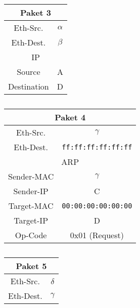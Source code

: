 \begin{table}[p]
    \centering
    \begin{tabular}{|c|c|}
        \hline
        \multicolumn{2}{|c|}{Paket 3} \\
        \hline
        Eth-Src.  & $\alpha$ \\
        \hline
        Eth-Dest. & $\beta$ \\
        \hline
        \multicolumn{2}{|c|}{IP} \\
        \hline
        Source & A \\
        \hline
        Destination & D \\
        \hline
    \end{tabular}
    \caption{}
    \label{tab:4.12.3}
\end{table}

\begin{table}[p]
    \begin{minipage}[t]{0.49\linewidth}
        \centering
        \begin{tabular}{|c|c|}
            \hline
            \multicolumn{2}{|c|}{Paket 4} \\
            \hline
            Eth-Src.  & $\gamma$ \\
            \hline
            Eth-Dest. & \verb|ff:ff:ff:ff:ff:ff| \\
            \hline
            \multicolumn{2}{|c|}{ARP} \\
            \hline
            Sender-MAC & $\gamma$ \\
            \hline
            Sender-IP & C \\
            \hline
            Target-MAC & \verb|00:00:00:00:00:00| \\
            \hline
            Target-IP & D \\
            \hline
            Op-Code & 0x01 (Request) \\
            \hline
        \end{tabular}
        \caption{}
        \label{tab:4.12.4}
    \end{minipage}
    \begin{minipage}[t]{0.49\linewidth}
        \centering
        \begin{tabular}{|c|c|}
            \hline
            \multicolumn{2}{|c|}{Paket 5} \\
            \hline
            Eth-Src.  & $\delta$ \\
            \hline
            Eth-Dest. & $\gamma$ \\

\end{tabular}
\end{minipage}
\end{table}
